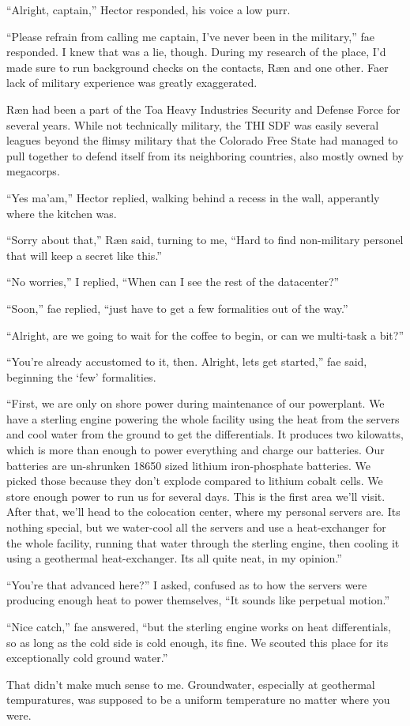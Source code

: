 ``Alright, captain,'' Hector responded, his voice a low purr.

``Please refrain from calling me captain, I've never been in the military,'' fae responded.  I knew that was a lie, though.  During my research of the place, I'd made sure to run background checks on the contacts, Ræn and one other.  Faer lack of military experience was greatly exaggerated.

Ræn had been a part of the Toa Heavy Industries Security and Defense Force for several years.  While not technically military, the THI SDF was easily several leagues beyond the flimsy military that the Colorado Free State had managed to pull together to defend itself from its neighboring countries, also mostly owned by megacorps.

``Yes ma'am,'' Hector replied, walking behind a recess in the wall, apperantly where the kitchen was.

``Sorry about that,'' Ræn said, turning to me, ``Hard to find non-military personel that will keep a secret like this.''

``No worries,'' I replied, ``When can I see the rest of the datacenter?''

``Soon,'' fae replied, ``just have to get a few formalities out of the way.''

``Alright, are we going to wait for the coffee to begin, or can we multi-task a bit?''

``You're already accustomed to it, then.  Alright, lets get started,'' fae said, beginning the `few' formalities.

``First, we are only on shore power during maintenance of our powerplant.  We have a sterling engine powering the whole facility using the heat from the servers and cool water from the ground to get the differentials.  It produces two kilowatts, which is more than enough to power everything and charge our batteries.  Our batteries are un-shrunken 18650 sized lithium iron-phosphate batteries.  We picked those because they don't explode compared to lithium cobalt cells.  We store enough power to run us for several days.  This is the first area we'll visit.  After that, we'll head to the colocation center, where my personal servers are.  Its nothing special, but we water-cool all the servers and use a heat-exchanger for the whole facility, running that water through the sterling engine, then cooling it using a geothermal heat-exchanger.  Its all quite neat, in my opinion.''

``You're that advanced here?'' I asked, confused as to how the servers were producing enough heat to power themselves, ``It sounds like perpetual motion.''

``Nice catch,'' fae answered, ``but the sterling engine works on heat differentials, so as long as the cold side is cold enough, its fine.  We scouted this place for its exceptionally cold ground water.''

That didn't make much sense to me.  Groundwater, especially at geothermal tempuratures, was supposed to be a uniform temperature no matter where you were.

